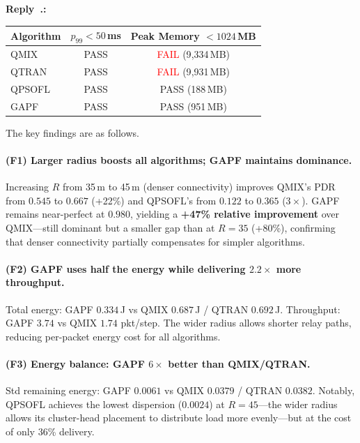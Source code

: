 \documentclass[11pt]{article}
\newcounter{reviewer}
\newcounter{replyctr}[reviewer]
\renewcommand{\thereplyctr}{\thereviewer.\arabic{replyctr}}
\newenvironment{reply}
  {\refstepcounter{replyctr}%
   \addtocounter{replyctr}{-1}%
   \medskip\noindent
   \begin{sf}\textbf{Reply~\thereplyctr:}\ }
  {\addtocounter{replyctr}{1}%
   \medskip\end{sf}}
\begin{document}
\begin{refsection}
\begin{mdframed}[style=Resp]
\begin{reply}
\begin{center}
\label{tab:constraints_n70_r45}
\begin{tabular}{lcc}
\toprule
Algorithm & $p_{99} < 50$\,ms & Peak Memory $< 1024$\,MB \\
\midrule
QMIX   & \textcolor{green!60!black}{PASS} & \textcolor{red}{FAIL} (9{,}334\,MB) \\
QTRAN  & \textcolor{green!60!black}{PASS} & \textcolor{red}{FAIL} (9{,}931\,MB) \\
QPSOFL & \textcolor{green!60!black}{PASS} & \textcolor{green!60!black}{PASS} (188\,MB) \\
GAPF   & \textcolor{green!60!black}{PASS} & \textcolor{green!60!black}{PASS} (951\,MB) \\
\bottomrule
\end{tabular}
\end{center}

The key findings are as follows.

\paragraph{(F1) Larger radius boosts all algorithms; GAPF maintains dominance.}
Increasing $R$ from 35\,m to 45\,m (denser connectivity) improves QMIX's PDR from $0.545$ to $0.667$ (+22\%) and QPSOFL's from $0.122$ to $0.365$ ($3\times$). GAPF remains near-perfect at $0.980$, yielding a \textbf{+47\% relative improvement} over QMIX---still dominant but a smaller gap than at $R{=}35$ (+80\%), confirming that denser connectivity partially compensates for simpler algorithms.

\paragraph{(F2) GAPF uses half the energy while delivering $2.2\times$ more throughput.}
Total energy: GAPF $0.334$\,J vs QMIX $0.687$\,J / QTRAN $0.692$\,J. Throughput: GAPF $3.74$ vs QMIX $1.74$ pkt/step. The wider radius allows shorter relay paths, reducing per-packet energy cost for all algorithms.

\paragraph{(F3) Energy balance: GAPF $6\times$ better than QMIX/QTRAN.}
Std remaining energy: GAPF $0.0061$ vs QMIX $0.0379$ / QTRAN $0.0382$. Notably, QPSOFL achieves the lowest dispersion ($0.0024$) at $R{=}45$---the wider radius allows its cluster-head placement to distribute load more evenly---but at the cost of only 36\% delivery.


\end{reply}
\end{mdframed}
\end{refsection}
\end{document}
